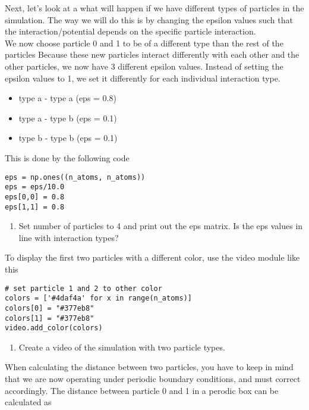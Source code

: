 \documentclass{article}
\begin{document}
Next, let's look at a what will happen if we have different types of particles in the simulation.
The way we will do this is by changing the epsilon values such that the interaction/potential depends on the specific particle interaction.\\

We now choose particle 0 and 1 to be of a different type than the rest of the particles
Because these new particles interact differently with each other and the other particles, we now have 3 different epsilon values.
Instead of setting the epsilon values to 1, we set it differently for each individual interaction type.

\begin{itemize}
    \item type a - type a (eps = 0.8)
    \item type a - type b (eps = 0.1)
    \item type b - type b (eps = 0.1)
\end{itemize}

This is done by the following code

\begin{lstlisting}
eps = np.ones((n_atoms, n_atoms))
eps = eps/10.0
eps[0,0] = 0.8
eps[1,1] = 0.8
\end{lstlisting}

\begin{enumerate}[resume]
    \item Set number of particles to 4 and print out the eps matrix.
        Is the eps values in line with interaction types?
\end{enumerate}

To display the first two particles with a different color, use the video module like this
\begin{lstlisting}
# set particle 1 and 2 to other color
colors = ['#4daf4a' for x in range(n_atoms)]
colors[0] = "#377eb8"
colors[1] = "#377eb8"
video.add_color(colors)
\end{lstlisting}


\begin{enumerate}[resume]
    \item Create a video of the simulation with two particle types.
\end{enumerate}

When calculating the distance between two particles, you have to keep in mind that we are now operating under periodic boundary conditions, and must correct accordingly.
The distance between particle 0 and 1 in a perodic box can be calculated as
\end{document}
